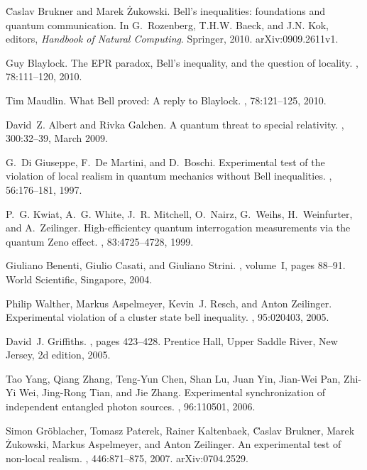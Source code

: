 \documentclass[10pt]{article} %
\begin{document}
\begin{thebibliography}{10}
{\u C}aslav Brukner and Marek \.Zukowski.
\newblock Bell's inequalities: foundations and quantum communication.
\newblock In G.~Rozenberg, T.H.W. Baeck, and J.N. Kok, editors, {\em Handbook
  of Natural Computing}. Springer, 2010.
\newblock arXiv:0909.2611v1.

Guy Blaylock.
\newblock The {E}{P}{R} paradox, {B}ell's inequality, and the question of
  locality.
, 78:111--120, 2010.

Tim Maudlin.
\newblock What {B}ell proved: {A} reply to {B}laylock.
, 78:121--125, 2010.

David~Z. Albert and Rivka Galchen.
\newblock A quantum threat to special relativity.
, 300:32--39, March 2009.

G.~{Di Giuseppe}, F.~{De Martini}, and D.~Boschi.
\newblock Experimental test of the violation of local realism in quantum
  mechanics without {B}ell inequalities.
, 56:176--181, 1997.

P.~G. Kwiat, A.~G. White, J.~R. Mitchell, O.~Nairz, G.~Weihs, H.~Weinfurter,
  and A.~Zeilinger.
\newblock High-efficientcy quantum interrogation measurements via the quantum
  {Z}eno effect.
, 83:4725--4728, 1999.

Giuliano Benenti, Giulio Casati, and Giuliano Strini.
, volume~I,
  pages 88--91.
\newblock World Scientific, Singapore, 2004.

Philip Walther, Markus Aspelmeyer, Kevin~J. Resch, and Anton Zeilinger.
\newblock Experimental violation of a cluster state bell inequality.
, 95:020403, 2005.

David~J. Griffiths.
, pages 423--428.
\newblock Prentice Hall, Upper Saddle River, New Jersey, 2d edition, 2005.

Tao Yang, Qiang Zhang, Teng-Yun Chen, Shan Lu, Juan Yin, Jian-Wei Pan, Zhi-Yi
  Wei, Jing-Rong Tian, and Jie Zhang.
\newblock Experimental synchronization of independent entangled photon sources.
, 96:110501, 2006.

Simon Gr{\"o}blacher, Tomasz Paterek, Rainer Kaltenbaek, {\u C}aslav Brukner,
  Marek {\.Z}ukowski, Markus Aspelmeyer, and Anton Zeilinger.
\newblock An experimental test of non-local realism.
, 446:871--875, 2007.
\newblock arXiv:0704.2529.


\end{thebibliography}
\end{document}
